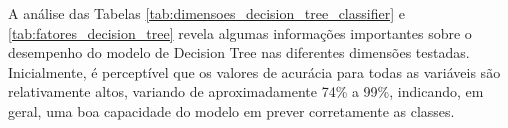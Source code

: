 A análise das Tabelas \ref{tab:dimensoes_decision_tree_classifier} e \ref{tab:fatores_decision_tree} revela algumas informações importantes sobre o desempenho do modelo de Decision Tree nas diferentes dimensões testadas. Inicialmente, é perceptível que os valores de acurácia para todas as variáveis são relativamente altos, variando de aproximadamente 74\% a 99\%, indicando, em geral, uma boa capacidade do modelo em prever corretamente as classes.

\begin{table}[ht]
    \centering
    \caption{Dimensões sendo testadas no modelo de Decision Tree}
    \label{tab:dimensoes_decision_tree_classifier}
\end{table}

